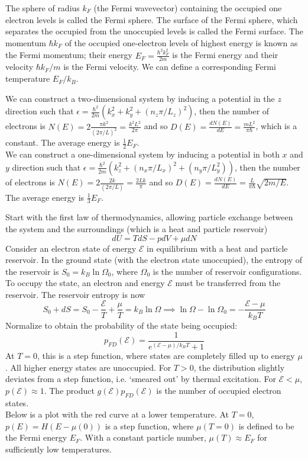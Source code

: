 \documentclass[a4paper]{article}
\begin{document}
\begin{defi}
The sphere of radius $k_F$ (the Fermi wavevector) containing the occupied one electron levels is called the Fermi sphere. The surface of the Fermi sphere, which separates the occupied from the unoccupied levels is called the Fermi surface. The momentum $\hbar k_F$ of the occupied one-electron levels of highest energy is known as the Fermi momentum; their energy $E_F=\frac{\hbar^2k_F^2}{2m}$ is the Fermi energy and their velocity $\hbar k_F/m$ is the Fermi velocity. We can define a corresponding Fermi temperature $E_F/k_B$.
\end{defi}
\begin{eg}
We can construct a two-dimensional system by inducing a potential in the $z$ direction such that $\epsilon=\frac{\hbar^2}{2m}(k_x^2+k_y^2+(n_z\pi/L_z)^2)$, then the number of electrons is $N(E)=2\frac{\pi k^2}{(2\pi/L)^2}=\frac{k^2L^2}{2\pi}$ and so $D(E)=\frac{dN(E)}{dE}=\frac{mL^2}{\pi\hbar}$, which is a constant. The average energy is $\frac{1}{2}E_F$.\\[5pt]
We can construct a one-dimensional system by inducing a potential in both $x$ and $y$ direction such that $\epsilon=\frac{\hbar^2}{2m}(k_z^2+(n_x\pi/L_x)^2+(n_y\pi/L_y^2))$, then the number of electrons is $N(E)=2\frac{2k}{(2\pi/L)}=\frac{2Lk}{\pi}$ and so $D(E)=\frac{dN(E)}{dE}=\frac{L}{\pi\hbar}\sqrt{2m/E}$. The average energy is $\frac{1}{3}E_F$.
\end{eg}
\begin{Note}
Start with the first law of thermodynamics, allowing particle exchange between the system and the surroundings (which is a heat and particle reservoir)
$$dU=TdS-pdV+\mu dN$$
Consider an electron state of energy $\mathcal{E}$ in equilibrium with a heat and particle reservoir. In the ground state (with the electron state unoccupied), the entropy of the reservoir is $S_0=k_B\ln\Omega_0$, where $\Omega_0$ is the number of reservoir configurations. To occupy the state, an electron and energy $\mathcal{E}$ must be transferred from the reservoir. The reservoir entropy is now
$$S_0+dS=S_0-\frac{\mathcal{E}}{T}+\frac{\mu}{T}=k_B\ln\Omega\implies\ln\Omega-\ln\Omega_0=-\frac{\mathcal{E}-\mu}{k_BT}$$
Normalize to obtain the probability of the state being occupied:
$$p_{FD}(\mathcal{E})=\frac{1}{e^{(\mathcal{E}-\mu)/k_BT}+1}$$
At $T=0$, this is a step function, where states are completely filled up to energy $\mu$. All higher energy states are unoccupied. For $T>0$, the distribution slightly deviates from a step function, i.e. `smeared out' by thermal excitation. For $\mathcal{E}<\mu$, $p(\mathcal{E})\approx 1$. The product $g(\mathcal{E})p_{FD}(\mathcal{E})$ is the number of occupied electron states.\\[5pt]
Below is a plot with the red curve at a lower temperature. At $T=0$, $p(E)=H(E-\mu(0))$ is a step function, where $\mu(T=0)$ is defined to be the Fermi energy $E_F$. With a constant particle number, $\mu(T)\approx E_F$ for sufficiently low temperatures.
\end{Note}
\end{document}
